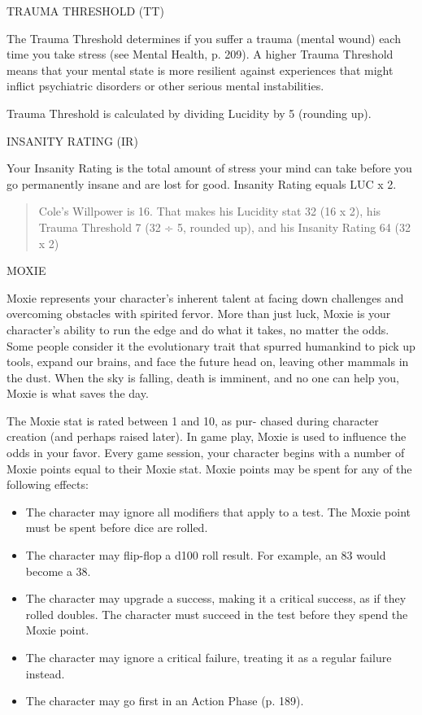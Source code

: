 TRAUMA THRESHOLD (TT)

The Trauma Threshold determines if you suffer a
trauma (mental wound) each time you take stress (see
Mental Health, p. 209). A higher Trauma Threshold
means that your mental state is more resilient against
experiences that might inflict psychiatric disorders or
other serious mental instabilities.

Trauma Threshold is calculated by dividing Lucidity
by 5 (rounding up).

INSANITY RATING (IR)

Your Insanity Rating is the total amount of stress your
mind can take before you go permanently insane and
are lost for good. Insanity Rating equals LUC x 2.

\begin{quotation}
  Cole's Willpower is 16. That makes his Lucidity stat 32 (16 x 2),
  his Trauma Threshold 7 (32 ÷ 5, rounded up), and his Insanity Rating
  64 (32 x 2)
\end{quotation}

MOXIE

Moxie represents your character's inherent talent at
facing down challenges and overcoming obstacles
with spirited fervor. More than just luck, Moxie is
your character's ability to run the edge and do what
it takes, no matter the odds. Some people consider it
the evolutionary trait that spurred humankind to pick
up tools, expand our brains, and face the future head
on, leaving other mammals in the dust. When the sky
is falling, death is imminent, and no one can help you,
Moxie is what saves the day.

The Moxie stat is rated between 1 and 10, as pur-
chased during character creation (and perhaps raised
later). In game play, Moxie is used to influence the
odds in your favor. Every game session, your character
begins with a number of Moxie points equal to their
Moxie stat. Moxie points may be spent for any of the
following effects:

\begin{itemize}
\item The character may ignore all modifiers that apply
  to a test. The Moxie point must be spent before
  dice are rolled.
\item The character may flip-flop a d100 roll result. For
  example, an 83 would become a 38.
\item The character may upgrade a success, making it a critical
  success, as if they rolled doubles. The character must succeed in
  the test before they spend the Moxie point.
\item The character may ignore a critical failure, treating it as a
  regular failure instead.
\item The character may go first in an Action Phase (p. 189).
\end{itemize}

